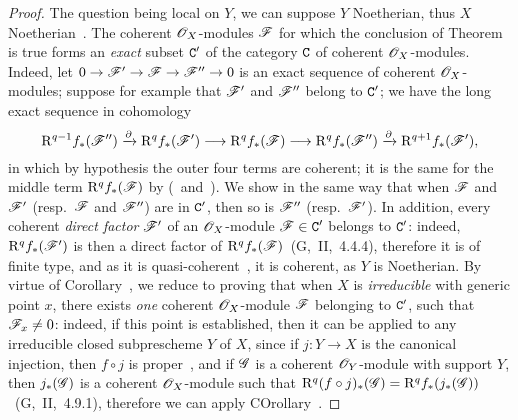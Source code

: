 \begin{proof}
\label{proof-3.3.2.1}
The question being local on $Y$, we can suppose $Y$ Noetherian, thus $X$ Noetherian~.
The coherent $\mathscr{O}_X$-modules $\mathscr{F}$ for which the conclusion of Theorem~ is true forms an \emph{exact} subset $\mathtt{C}'$ of the category $\mathtt{C}$ of coherent $\mathscr{O}_X$-modules.
Indeed, let $0\to\sh{F}'\to\sh{F}\to\sh{F}''\to 0$ is an exact sequence of coherent $\mathscr{O}_X$-modules; suppose for example that $\mathscr{F}'$ and $\mathscr{F}''$ belong to $\mathtt{C}'$; we have the long exact sequence in cohomology
\[
  \RR^{q-1}f_*(\sh{F}'')\xrightarrow{\partial}\RR^q f_*(\sh{F}')\to\RR^q f_*(\sh{F})\to\RR^q f_*(\sh{F}'')\xrightarrow{\partial}\RR^{q+1}f_*(\sh{F}'),
\]
in which by hypothesis the outer four terms are coherent; it is the same for the middle term $\mathrm{R}^q f_*(\mathscr{F})$ by (~and~).
We show in the same way that when $\mathscr{F}$ and $\mathscr{F}'$ (resp.~$\mathscr{F}$ and $\mathscr{F}''$) are in $\mathtt{C}'$, then so is $\mathscr{F}''$ (resp.~$\mathscr{F}'$).
In addition, every coherent \emph{direct factor} $\mathscr{F}'$ of an $\mathscr{O}_X$-module $\mathscr{F}\in\mathtt{C}'$ belongs to $\mathtt{C}'$: indeed, $\mathrm{R}^q f_*(\mathscr{F}')$ is then a direct factor of $\mathrm{R}^q f_*(\mathscr{F})$~(G,~II,~4.4.4), therefore it is of finite type, and as it is quasi-coherent~, it is coherent, as $Y$ is Noetherian.
By virtue of Corollary~, we reduce to proving that when $X$ is \emph{irreducible} with generic point $x$, there exists \emph{one} coherent $\mathscr{O}_X$-module $\mathscr{F}$ belonging to $\mathtt{C}'$, such that $\mathscr{F}_x\neq 0$: indeed, if this point is established, then it can be applied to any irreducible closed subprescheme $Y$ of $X$, since if $j:Y\to X$ is the canonical injection, then $f\circ j$ is proper~, and if $\mathscr{G}$ is a coherent $\mathscr{O}_Y$-module with support $Y$, then $j_*(\mathscr{G})$ is a coherent $\mathscr{O}_X$-module such that $\mathrm{R}^q(f\circ j)_*(\mathscr{G})=\mathrm{R}^q f_*(j_*(\mathscr{G}))$~(G,~II,~4.9.1), therefore we can apply COrollary~.


\end{proof}
